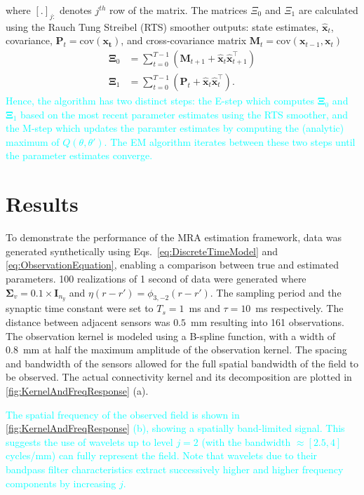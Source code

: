 \documentclass[journal,a4paper]{IEEEtran}
\newcommand{\cut}[1]{\textcolor{cyan}{#1}}
\begin{document}
where $[.]_{j:} $ denotes $j^{th}$ row of the matrix. The matrices $\Xi_0$ and $\Xi_1$ are calculated using the Rauch Tung Streibel (RTS)\cite{RAUCH1965} smoother outputs: state estimates, $\hat{\mathbf x}_t$, covariance, $\mathbf P_t=\mathrm{cov}(\mathbf{x_t})$, and cross-covariance matrix $\mathbf M_t=\mathrm{cov}(\mathbf{x}_{t-1},\mathbf{x}_{t})$ 
\begin{align}\label{eq:Xivariables}
\boldsymbol\Xi_0&=\sum_{t=0}^{T-1}\left(\mathbf M_{t+1}+\mathbf{\hat x}_t\mathbf{\hat x}_{t+1}^\top\right) \\
 \boldsymbol\Xi_1&=\sum_{t=0}^{T-1}\left(\mathbf P_t+\mathbf{\hat x}_t\mathbf{\hat x}_t^\top\right).
\end{align}
 \cut{Hence, the algorithm has two distinct steps: the E-step which computes $\boldsymbol\Xi_0$ and $\boldsymbol\Xi_1$ based on the most recent parameter estimates using the RTS smoother, and the M-step which updates the paramter estimates by computing the (analytic) maximum of $Q(\theta,\theta')$. The EM algorithm iterates between these two steps until the parameter estimates converge.} 

\section{Results}
To demonstrate the performance of the MRA estimation framework, data was generated synthetically  using Eqs.~\ref{eq:DiscreteTimeModel} and \ref{eq:ObservationEquation}, enabling a comparison between true and estimated parameters. 100 realizations of 1 second of data were generated where $\boldsymbol\Sigma_v=0.1 \times \mathbf{I}_{n_y}$ and $\eta(r-r')=\phi_{3,-2}(r-r')$. The sampling period and the synaptic time constant were set to $T_s = 1$~ms and $\tau = 10$~ms respectively. The distance between adjacent sensors was $0.5$~mm resulting into 161 observations. The observation kernel is modeled using a B-spline function, with a width of 0.8~mm at half the maximum amplitude of the observation kernel. The spacing and bandwidth of the sensors allowed for the full spatial bandwidth of the field to be observed. The actual connectivity kernel and its decomposition are plotted in \figurename{\ref{fig:KernelAndFreqResponse}} (a). 

 \cut{The spatial frequency of the observed field is shown in \figurename{\ref{fig:KernelAndFreqResponse}} (b), showing a spatially band-limited signal. This suggests the use of wavelets up to level $j=2$ (with the bandwidth $\approx[2.5,4]$ cycles/mm) can fully represent the field. Note that wavelets due to their bandpass filter characteristics extract successively higher and higher frequency components by increasing $j$.}
\end{document}
